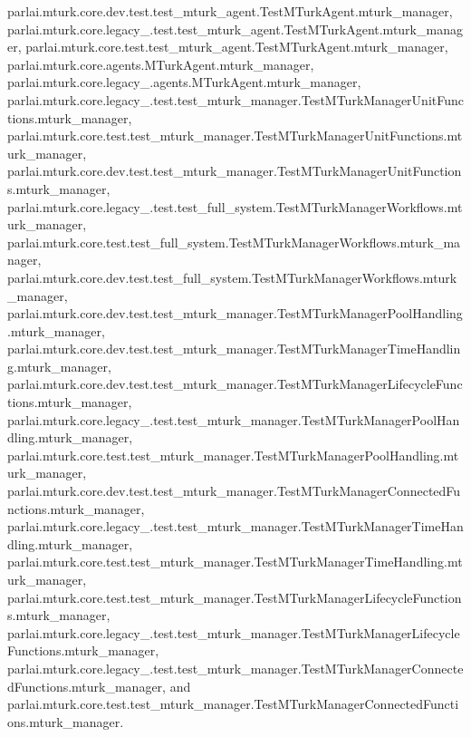 parlai.\+mturk.\+core.\+dev.\+test.\+test\+\_\+mturk\+\_\+agent.\+Test\+M\+Turk\+Agent.\+mturk\+\_\+manager, parlai.\+mturk.\+core.\+legacy\+\_.\+test.\+test\+\_\+mturk\+\_\+agent.\+Test\+M\+Turk\+Agent.\+mturk\+\_\+manager, parlai.\+mturk.\+core.\+test.\+test\+\_\+mturk\+\_\+agent.\+Test\+M\+Turk\+Agent.\+mturk\+\_\+manager, parlai.\+mturk.\+core.\+agents.\+M\+Turk\+Agent.\+mturk\+\_\+manager, parlai.\+mturk.\+core.\+legacy\+\_.\+agents.\+M\+Turk\+Agent.\+mturk\+\_\+manager, parlai.\+mturk.\+core.\+legacy\+\_.\+test.\+test\+\_\+mturk\+\_\+manager.\+Test\+M\+Turk\+Manager\+Unit\+Functions.\+mturk\+\_\+manager, parlai.\+mturk.\+core.\+test.\+test\+\_\+mturk\+\_\+manager.\+Test\+M\+Turk\+Manager\+Unit\+Functions.\+mturk\+\_\+manager, parlai.\+mturk.\+core.\+dev.\+test.\+test\+\_\+mturk\+\_\+manager.\+Test\+M\+Turk\+Manager\+Unit\+Functions.\+mturk\+\_\+manager, parlai.\+mturk.\+core.\+legacy\+\_.\+test.\+test\+\_\+full\+\_\+system.\+Test\+M\+Turk\+Manager\+Workflows.\+mturk\+\_\+manager, parlai.\+mturk.\+core.\+test.\+test\+\_\+full\+\_\+system.\+Test\+M\+Turk\+Manager\+Workflows.\+mturk\+\_\+manager, parlai.\+mturk.\+core.\+dev.\+test.\+test\+\_\+full\+\_\+system.\+Test\+M\+Turk\+Manager\+Workflows.\+mturk\+\_\+manager, parlai.\+mturk.\+core.\+dev.\+test.\+test\+\_\+mturk\+\_\+manager.\+Test\+M\+Turk\+Manager\+Pool\+Handling.\+mturk\+\_\+manager, parlai.\+mturk.\+core.\+dev.\+test.\+test\+\_\+mturk\+\_\+manager.\+Test\+M\+Turk\+Manager\+Time\+Handling.\+mturk\+\_\+manager, parlai.\+mturk.\+core.\+dev.\+test.\+test\+\_\+mturk\+\_\+manager.\+Test\+M\+Turk\+Manager\+Lifecycle\+Functions.\+mturk\+\_\+manager, parlai.\+mturk.\+core.\+legacy\+\_.\+test.\+test\+\_\+mturk\+\_\+manager.\+Test\+M\+Turk\+Manager\+Pool\+Handling.\+mturk\+\_\+manager, parlai.\+mturk.\+core.\+test.\+test\+\_\+mturk\+\_\+manager.\+Test\+M\+Turk\+Manager\+Pool\+Handling.\+mturk\+\_\+manager, parlai.\+mturk.\+core.\+dev.\+test.\+test\+\_\+mturk\+\_\+manager.\+Test\+M\+Turk\+Manager\+Connected\+Functions.\+mturk\+\_\+manager, parlai.\+mturk.\+core.\+legacy\+\_.\+test.\+test\+\_\+mturk\+\_\+manager.\+Test\+M\+Turk\+Manager\+Time\+Handling.\+mturk\+\_\+manager, parlai.\+mturk.\+core.\+test.\+test\+\_\+mturk\+\_\+manager.\+Test\+M\+Turk\+Manager\+Time\+Handling.\+mturk\+\_\+manager, parlai.\+mturk.\+core.\+test.\+test\+\_\+mturk\+\_\+manager.\+Test\+M\+Turk\+Manager\+Lifecycle\+Functions.\+mturk\+\_\+manager, parlai.\+mturk.\+core.\+legacy\+\_.\+test.\+test\+\_\+mturk\+\_\+manager.\+Test\+M\+Turk\+Manager\+Lifecycle\+Functions.\+mturk\+\_\+manager, parlai.\+mturk.\+core.\+legacy\+\_.\+test.\+test\+\_\+mturk\+\_\+manager.\+Test\+M\+Turk\+Manager\+Connected\+Functions.\+mturk\+\_\+manager, and parlai.\+mturk.\+core.\+test.\+test\+\_\+mturk\+\_\+manager.\+Test\+M\+Turk\+Manager\+Connected\+Functions.\+mturk\+\_\+manager.

